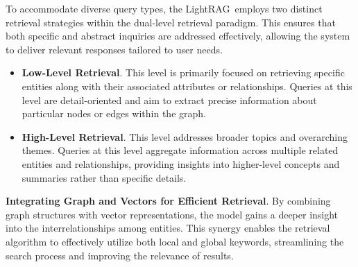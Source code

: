 \documentclass{article} %
\def\model{LightRAG}
\begin{document}
To accommodate diverse query types, the \model\ employs two distinct retrieval strategies within the dual-level retrieval paradigm. This ensures that both specific and abstract inquiries are addressed effectively, allowing the system to deliver relevant responses tailored to user needs.
\begin{itemize}[leftmargin=*]

\item \textbf{Low-Level Retrieval}. This level is primarily focused on retrieving specific entities along with their associated attributes or relationships. Queries at this level are detail-oriented and aim to extract precise information about particular nodes or edges within the graph.

\item \textbf{High-Level Retrieval}. This level addresses broader topics and overarching themes. Queries at this level aggregate information across multiple related entities and relationships, providing insights into higher-level concepts and summaries rather than specific details.

\end{itemize}

\textbf{Integrating Graph and Vectors for Efficient Retrieval}.
By combining graph structures with vector representations, the model gains a deeper insight into the interrelationships among entities. This synergy enables the retrieval algorithm to effectively utilize both local and global keywords, streamlining the search process and improving the relevance of results.\vspace{-0.05in}
\end{document}
